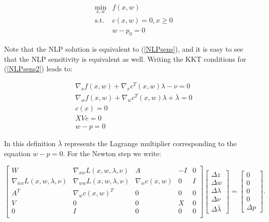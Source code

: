 \documentclass[letter, 11pt]{article}
\begin{document}
\begin{subequations} \label{NLPsens2}
\begin{eqnarray}
&  \min_{x, w} & f(x, w) \\
&  \mbox{s.t.} & c(x, w) = 0, x \geq 0 \\
& & w - p_0 = 0
\end{eqnarray}
\end{subequations}

Note that the NLP solution is equivalent to (\ref{NLPsens}), and
it is easy to see that the NLP sensitivity is equivalent as well.
Writing the KKT conditions for (\ref{NLPsens2}) leads to:

\begin{subequations}\label{eq:reform}
\begin{eqnarray}
& \nabla_x f(x, w) + \nabla_x c^T(x, w)\lambda -\nu = 0\\
& \nabla_w f(x, w) + \nabla_w c^T(x, w)\lambda + \bar{\lambda} = 0\\
& c(x) = 0 \\ & XVe =0 \\ & w - p = 0
\end{eqnarray}
\end{subequations}

In this definition $\bar{\lambda}$ represents the Lagrange multiplier
corresponding to the equation $w - p =0$. For the Newton step we write:

\begin{equation}
  \label{eq:reordered_K_3}
  \left[
  \begin{array}{ccccc}
  W&   \nabla_{xw} L(x, w, \lambda, \nu) & A & -I & 0 \\
  \nabla_{wx} L(x, w, \lambda, \nu) &  \nabla_{ww} L(x, w, \lambda, \nu)
  & \nabla_w c(x, w) & 0 & I \\
      A^T& \nabla_w c(x, w)^T & 0 & 0 & 0 \\
      V &0&0& X & 0 \\
      0 & I &0&0&0\\
  \end{array}
  \right]
  \left[
    \begin{array}{c}
      \Delta z\\ \Delta w \\ \Delta \lambda\\\Delta\nu\\ \Delta\bar{\lambda}
    \end{array}
  \right]
  =
  \left[
   \begin{array}{c}
      0 \\0 \\ 0 \\ 0 \\ \Delta p
   \end{array} \right].
\end{equation}
\end{document}
